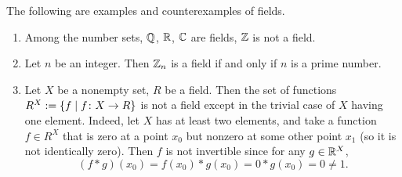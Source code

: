 \begin{example}
  The following are examples and counterexamples of fields.
  \begin{enumerate}
    \item
      Among the number sets, $\mathbb{Q}$, $\mathbb{R}$, $\mathbb{C}$ are fields, $\mathbb{Z}$ is not a field.
    \item
      Let $n$ be an integer.
      Then $\mathbb{Z}_n$ is a field if and only if $n$ is a prime number.
    \item
      Let $X$ be a nonempty set, $R$ be a field.
      Then the set of functions $R^X := \left\{ f \mid f \colon X \to R \right\}$ is not a
      field except in the trivial case of $X$ having one element.
      Indeed, let $X$ has at least two elements, and take a function $f \in R^X$
      that is zero at a point $x_0$ but nonzero at some other point $x_1$
      (so it is not identically zero).
      Then $f$ is not invertible since for any $g \in \mathbb{R}^X$,
      \begin{equation}
        (f * g)(x_0) = f(x_0) * g(x_0) = 0 * g(x_0) = 0 \neq 1.
      \end{equation}
  \end{enumerate}
\end{example}
